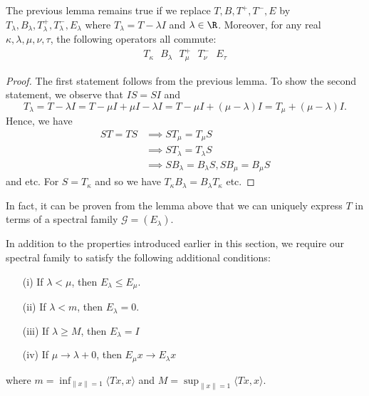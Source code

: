 \begin{lemma}\label{9.8-2}
   The previous lemma remains true if we replace \( T, B , T^{+}, T^{-}, E  \) by \( {T}_{\lambda}, {B}_{\lambda}, {T}_{\lambda}^{+}, {T}_{\lambda}^{-}, {E}_{\lambda} \) where \( {T}_{\lambda} = T - \lambda I  \) and \( \lambda \in \R  \). Moreover, for any real \( \kappa, \lambda , \mu, \nu, \tau  \), the following operators all commute:
   \begin{align*}  {T}_{\kappa} \ \ \   {B}_{\lambda} \ \ \  {T}_{\mu}^{+} \ \ \  {T}_{\nu}^{-} \ \ \   {E}_{\tau}   \end{align*}
\end{lemma}
\begin{proof}
The first statement follows from the previous lemma. To show the second statement, we observe that \( IS = SI  \) and 
\[  {T}_{\lambda} = T - \lambda I  = T - \mu I + \mu I - \lambda I  = T - \mu I + (\mu - \lambda)I  = {T}_{\mu} + (\mu - \lambda) I. \]
Hence, we have 
\begin{align*}
    ST = TS &\implies S {T}_{\mu } = {T}_{\mu } S   \\
            &\implies S  {T}_{\lambda} = {T}_{\lambda} S  \\
            &\implies S {B}_{\lambda} = {B}_{\lambda} S, S {B}_{\mu } = {B}_{\mu } S  
\end{align*}
and etc. For \( S = {T}_{\kappa} \) and so we have \( {T}_{\kappa} {B}_{\lambda} = {B}_{\lambda} {T}_{\kappa}   \) etc.
\end{proof}


In fact, it can be proven from the lemma above that we can uniquely express \( T  \) in terms of a spectral family \( \mathcal{G} = ({E}_{\lambda}) \). 

In addition to the properties introduced earlier in this section, we require our spectral family to satisfy the following additional conditions:
\begin{enumerate}
    \item[(i)] If \( \lambda < \mu  \), then \( {E}_{\lambda} \leq {E}_{\mu } \).
    \item[(ii)] If \( \lambda < m  \), then \( {E}_{\lambda} = 0  \).
    \item[(iii)] If \( \lambda \geq M   \), then \( {E}_{\lambda} = I  \) 
    \item[(iv)] If \( \mu \to \lambda + 0  \), then \( {E}_{\mu } x \to {E}_{\lambda} x  \)
\end{enumerate}
where \( m = \inf_{\|x\| = 1 } \langle Tx  ,  x  \rangle  \) and \( M = \sup_{\|x\| = 1 } \langle Tx  , x  \rangle \).


